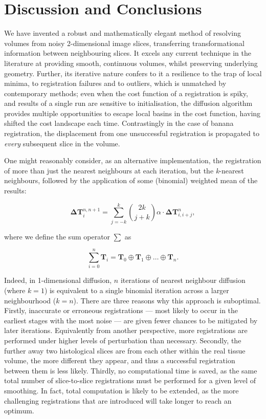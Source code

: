 \section{Discussion and Conclusions} %
\label{sec:discussion_and_conclusions}
  We have invented a robust and mathematically elegant method of resolving volumes from noisy 2-dimensional image slices, transferring transformational information between neighbouring slices. It excels any current technique in the literature at providing smooth, continuous volumes, whilst preserving underlying geometry. Further, its iterative nature confers to it a resilience to the trap of local minima, to registration failures and to outliers, which is unmatched by contemporary methods; even when the cost function of a registration is spiky, and results of a single run are sensitive to initialisation, the diffusion algorithm provides multiple opportunities to escape local basins in the cost function, having shifted the cost landscape each time. Contrastingly in the case of banana registration, the displacement from one unsuccessful registration is propagated to \emph{every} subsequent slice in the volume.
  
  One might reasonably consider, as an alternative implementation, the registration of more than just the nearest neighbours at each iteration, but the \emph{k}-nearest neighbours, followed by the application of some (binomial) weighted mean of the results:
  
  \begin{equation}
    \mathbf{\Delta T}_i^{n,n+1} = \sum_{j=-k}^k \binom{2k}{j+k}\alpha \cdot \mathbf{\Delta T}_{i,i+j}^n,
  \end{equation}
  
  where we define the sum operator $\sum$ as
  
  \begin{equation}
    \sum_{i=0}^n \mathbf{T}_i = \mathbf{T}_0 \oplus \mathbf{T}_1 \oplus \ldots \oplus \mathbf{T}_n.
  \end{equation}
  
  Indeed, in 1-dimensional diffusion, $n$ iterations of nearest neighbour diffusion (where $k=1$) is equivalent to a single binomial iteration across a larger neighbourhood ($k=n$). There are three reasons why this approach is suboptimal. Firstly, inaccurate or erroneous registrations --- most likely to occur in the earliest stages with the most noise --- are given fewer chances to be mitigated by later iterations. Equivalently from another perspective, more registrations are performed under higher levels of perturbation than necessary. Secondly, the further away two histological slices are from each other within the real tissue volume, the more different they appear, and thus a successful registration between them is less likely. Thirdly, no computational time is saved, as the same total number of slice-to-slice registrations must be performed for a given level of smoothing. In fact, total computation is likely to be extended, as the more challenging registrations that are introduced will take longer to reach an optimum.
  
